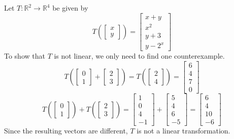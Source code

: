 \documentclass[10pt,]{book}
\theoremstyle{ptxplainnotitle}
\theoremstyle{ptxplaintitle}
\theoremstyle{ptxdefinitionnotitle}
\theoremstyle{ptxdefinitiontitle}
\theoremstyle{ptxdefinitionnotitle}
\theoremstyle{ptxdefinitiontitle}
\theoremstyle{ptxdefinitionnotitle}
\theoremstyle{ptxdefinitiontitle}
\theoremstyle{ptxdefinitionnotitle}
\theoremstyle{ptxdefinitiontitle}
\newcommand{\IR}{\mathbb{R}}
\begin{document}
\begin{example}\label{example-2}
\hypertarget{p-11}{}%
Let \(T : \IR^2 \rightarrow \IR^4\) be given by%
%
\begin{equation*}
T\left(\begin{bmatrix} x \\ y \end{bmatrix} \right)
=
\begin{bmatrix} x+y \\ x^2 \\ y+3 \\ y-2^x \end{bmatrix}
\end{equation*}
\hypertarget{p-12}{}%
To show that \(T\) is not linear, we only need to find one counterexample.%
%
\begin{equation*}
T\left(
\begin{bmatrix} 0 \\ 1 \end{bmatrix} +
\begin{bmatrix} 2 \\ 3 \end{bmatrix}
\right)
=
T\left(
\begin{bmatrix} 2 \\ 4 \end{bmatrix}
\right) =
\begin{bmatrix} 6 \\ 4 \\ 7 \\ 0 \end{bmatrix}
\end{equation*}
%
\begin{equation*}
T\left(
\begin{bmatrix} 0 \\ 1 \end{bmatrix}
\right) + T\left(
\begin{bmatrix} 2 \\ 3\end{bmatrix}
\right)
=
\begin{bmatrix} 1 \\ 0 \\ 4 \\ -1 \end{bmatrix} +
\begin{bmatrix} 5 \\ 4 \\ 6 \\ -5 \end{bmatrix}
=
\begin{bmatrix} 6 \\ 4 \\ 10 \\ -6 \end{bmatrix}
\end{equation*}
\hypertarget{p-13}{}%
Since the resulting vectors are different, \(T\) is not a linear transformation.%
\end{example}
\end{document}
